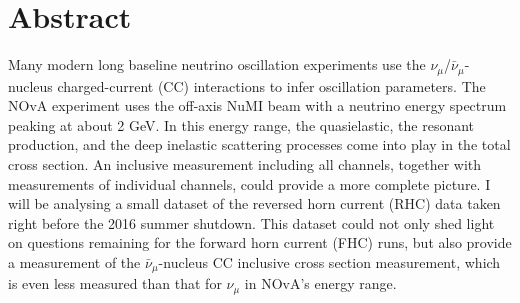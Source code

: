 \documentclass[12pt,letterpaper,oneside,openright]{book}
\begin{document}
\chapter*{\centering Abstract}
\begin{sloppypar}
Many modern long baseline neutrino oscillation experiments use the $\nu_\mu$/$\bar{\nu}_\mu$-nucleus charged-current (CC) interactions to infer oscillation parameters. The NOvA experiment uses the off-axis NuMI beam with a neutrino energy spectrum peaking at about 2 GeV. In this energy range, the quasielastic, the resonant production, and the deep inelastic scattering processes come into play in the total cross section. An inclusive measurement including all channels, together with measurements of individual channels, could provide a more complete picture. I will be analysing a small dataset of the reversed horn current (RHC) data taken right before the 2016 summer shutdown. This dataset could not only shed light on questions remaining for the forward horn current (FHC) runs, but also provide a measurement of the $\bar{\nu}_\mu$-nucleus CC inclusive cross section measurement, which is even less measured than that for $\nu_\mu$ in NOvA's energy range.
\end{sloppypar}
\end{document}
